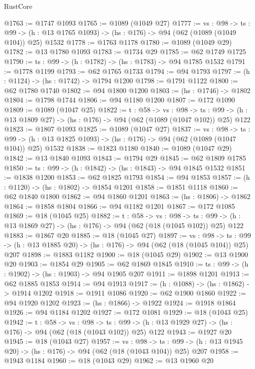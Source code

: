 \begin{lexlean}{RustCore}
\begin{coremodule}
@1763 := @1747 @1093
@1765 := @1089 (@1049 @27)
@1777 := {vs : @98} ->
  {ts : @99} -> (h : @13 @1765 @1093) -> (hs : @176) -> @94 (@62 (@1089 (@1049 @104)) @25) @1532
@1778 := @1763 @1178
@1780 := @1089 (@1049 @29)
@1782 := @13 @1780 @1093
@1783 := @1734 @29
@1785 := @62 @1749 @1725
@1790 := {ts : @99} -> (h : @1782) -> (hs : @1783) -> @94 @1785 @1532
@1791 := @1778 @1199
@1793 := @62 @1765 @1733
@1794 := @94 @1793
@1797 := (h : @1124) -> (hs : @1742) -> @1794 @1200
@1798 := @1791 @1122
@1800 := @62 @1780 @1740
@1802 := @94 @1800 @1200
@1803 := (hs : @1746) -> @1802
@1804 := @1798 @1744
@1806 := @94 @1180 @1200
@1807 := @172 @1090
@1809 := @1089 (@1047 @25)
@1822 := {t : @58} ->
  {vs : @98} ->
  {ts : @99} -> (h : @13 @1809 @27) -> (hs : @176) -> @94 (@62 (@1089 (@1047 @102)) @25) @122
@1823 := @1807 @1093
@1825 := @1089 (@1047 @27)
@1837 := {vs : @98} ->
  {ts : @99} -> (h : @13 @1825 @1093) -> (hs : @176) -> @94 (@62 (@1089 (@1047 @104)) @25) @1532
@1838 := @1823 @1180
@1840 := @1089 (@1047 @29)
@1842 := @13 @1840 @1093
@1843 := @1794 @29
@1845 := @62 @1809 @1785
@1850 := {ts : @99} -> (h : @1842) -> (hs : @1843) -> @94 @1845 @1532
@1851 := @1838 @1200
@1853 := @62 @1825 @1793
@1854 := @94 @1853
@1857 := (h : @1120) -> (hs : @1802) -> @1854 @1201
@1858 := @1851 @1118
@1860 := @62 @1840 @1800
@1862 := @94 @1860 @1201
@1863 := (hs : @1806) -> @1862
@1864 := @1858 @1804
@1866 := @94 @1182 @1201
@1867 := @172 @1085
@1869 := @18 (@1045 @25)
@1882 := {t : @58} ->
  {vs : @98} ->
  {ts : @99} -> (h : @13 @1869 @27) -> (hs : @176) -> @94 (@62 (@18 (@1045 @102)) @25) @122
@1883 := @1867 @20
@1885 := @18 (@1045 @27)
@1897 := {vs : @98} ->
  {ts : @99} -> (h : @13 @1885 @20) -> (hs : @176) -> @94 (@62 (@18 (@1045 @104)) @25) @207
@1898 := @1883 @1182
@1900 := @18 (@1045 @29)
@1902 := @13 @1900 @20
@1903 := @1854 @29
@1905 := @62 @1869 @1845
@1910 := {ts : @99} -> (h : @1902) -> (hs : @1903) -> @94 @1905 @207
@1911 := @1898 @1201
@1913 := @62 @1885 @1853
@1914 := @94 @1913
@1917 := (h : @1088) -> (hs : @1862) -> @1914 @1202
@1918 := @1911 @1086
@1920 := @62 @1900 @1860
@1922 := @94 @1920 @1202
@1923 := (hs : @1866) -> @1922
@1924 := @1918 @1864
@1926 := @94 @1184 @1202
@1927 := @172 @1081
@1929 := @18 (@1043 @25)
@1942 := {t : @58} ->
  {vs : @98} ->
  {ts : @99} -> (h : @13 @1929 @27) -> (hs : @176) -> @94 (@62 (@18 (@1043 @102)) @25) @122
@1943 := @1927 @20
@1945 := @18 (@1043 @27)
@1957 := {vs : @98} ->
  {ts : @99} -> (h : @13 @1945 @20) -> (hs : @176) -> @94 (@62 (@18 (@1043 @104)) @25) @207
@1958 := @1943 @1184
@1960 := @18 (@1043 @29)
@1962 := @13 @1960 @20

\end{coremodule}
\end{lexlean}
